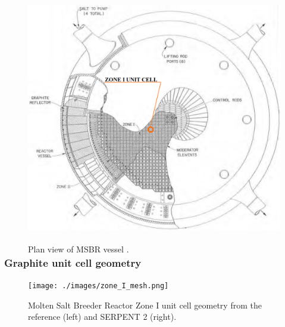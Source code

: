 \begin{frame}
\begin{columns}
     \column[t]{5.6cm}
           \begin{figure}
             \vspace{-0.15in}          
             \hspace*{-0.25in}
                \includegraphics[height=1.03\textwidth]{./images/plan_view_vessel.png}
				\caption{Plan view of \gls{MSBR} vessel \cite{robertson_conceptual_1971}.}
      \end{figure}
  \end{columns}
              
 \end{frame}

\begin{frame}
  \frametitle{Graphite unit cell geometry}
    \begin{figure}[t]
                \vspace*{-0.2in}
                   \hspace*{-0.37in}
                \texttt{[image: ./images/zone\_I\_mesh.png]}
                \vspace*{-0.05in}
                \caption{Molten Salt Breeder Reactor Zone I unit cell geometry from the reference \cite{robertson_conceptual_1971} (left) and SERPENT 2 (right).}
      \end{figure}
     
\end{frame}

